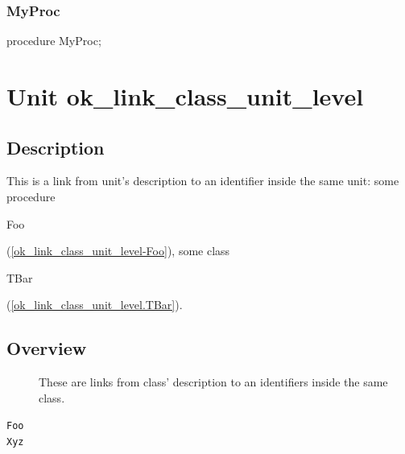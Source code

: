 \documentclass{report}
\newif\ifpdf
\begin{document}
\subsection*{MyProc}
\fi
\label{ok_links_2-MyProc}
\begin{list}{}{
\setlength{\itemindent}{0cm}
\setlength{\listparindent}{0cm}
\setlength{\leftmargin}{\evensidemargin}
\addtolength{\leftmargin}{\tmplength}
\settowidth{\labelsep}{X}
\addtolength{\leftmargin}{\labelsep}
\setlength{\labelwidth}{\tmplength}
}
\item[\textbf{Declaration}\hfill]
\ifpdf
\begin{flushleft}
\fi
\begin{ttfamily}
procedure MyProc;\end{ttfamily}

\ifpdf
\end{flushleft}
\fi

\end{list}
\chapter{Unit ok{\_}link{\_}class{\_}unit{\_}level}
\label{ok_link_class_unit_level}
\section{Description}
This is a link from unit's description to an identifier inside the same unit: some procedure \begin{ttfamily}Foo\end{ttfamily}(\ref{ok_link_class_unit_level-Foo}), some class \begin{ttfamily}TBar\end{ttfamily}(\ref{ok_link_class_unit_level.TBar}).
\section{Overview}
\begin{description}
\item[\texttt{\begin{ttfamily}TBar\end{ttfamily} Class}]These are links from class' description to an identifiers inside the same class.
\end{description}
\begin{description}
\item[\texttt{Foo}]
\item[\texttt{Xyz}]
\end{description}
\end{document}
